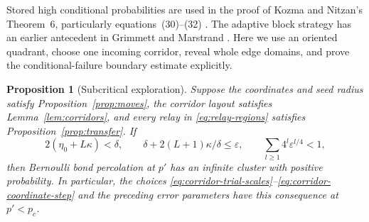 \documentclass[11pt]{article}
\newtheorem{proposition}[theorem]{Proposition}
\theoremstyle{definition}
\begin{document}
Stored high conditional probabilities are used in the proof of
Kozma and Nitzan's Theorem~6, particularly equations~(30)--(32)
\cite{KozmaNitzan2024}. The adaptive block strategy has an earlier
antecedent in Grimmett and Marstrand \cite[Sections~3--4]{GrimmettMarstrand1990}.
Here we use an oriented quadrant, choose one incoming corridor,
reveal whole edge domains, and prove the conditional-failure boundary
estimate explicitly.

\begin{proposition}[Subcritical exploration]\label{prop:exploration}
Suppose the coordinates and seed radius satisfy
Proposition~\ref{prop:moves}, the corridor layout satisfies
Lemma~\ref{lem:corridors}, and every relay in
\eqref{eq:relay-regions} satisfies Proposition~\ref{prop:transfer}.
If
\[
 2(\eta_0+L\kappa)<\delta,\qquad
 \delta+2(L+1)\kappa/\delta\le\varepsilon,
 \qquad\sum_{l\ge1}4^l\varepsilon^{l/4}<1,
\]
then Bernoulli bond percolation at $p'$ has an infinite cluster with
positive probability. In particular, the choices
\eqref{eq:corridor-trial-scales}--\eqref{eq:corridor-coordinate-step}
and the preceding error parameters have this consequence at $p'<p_c$.
\end{proposition}
\end{document}
